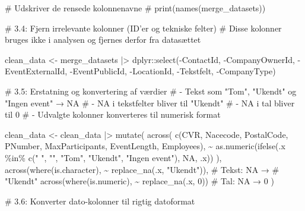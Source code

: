 \documentclass[
  11pt,
  letterpaper,
  DIV=11,
  numbers=noendperiod]{scrartcl}
\newenvironment{Shaded}{\begin{snugshade}}{\end{snugshade}}
\newcommand{\CommentTok}[1]{\textcolor[rgb]{0.37,0.37,0.37}{#1}}
\newcommand{\ConstantTok}[1]{\textcolor[rgb]{0.56,0.35,0.01}{#1}}
\newcommand{\DecValTok}[1]{\textcolor[rgb]{0.68,0.00,0.00}{#1}}
\newcommand{\FunctionTok}[1]{\textcolor[rgb]{0.28,0.35,0.67}{#1}}
\newcommand{\NormalTok}[1]{\textcolor[rgb]{0.00,0.23,0.31}{#1}}
\newcommand{\OtherTok}[1]{\textcolor[rgb]{0.00,0.23,0.31}{#1}}
\newcommand{\SpecialCharTok}[1]{\textcolor[rgb]{0.37,0.37,0.37}{#1}}
\newcommand{\StringTok}[1]{\textcolor[rgb]{0.13,0.47,0.30}{#1}}
\begin{document}
\begin{Shaded}
\begin{Highlighting}[]
\CommentTok{\# Udskriver de rensede kolonnenavne}
\CommentTok{\# print(names(merge\_datasets))}

\CommentTok{\# 3.4: Fjern irrelevante kolonner (ID’er og tekniske felter)}
\CommentTok{\# Disse kolonner bruges ikke i analysen og fjernes derfor fra datasættet}

\NormalTok{clean\_data }\OtherTok{\textless{}{-}}\NormalTok{ merge\_datasets }\SpecialCharTok{|\textgreater{}} 
\NormalTok{  dplyr}\SpecialCharTok{::}\FunctionTok{select}\NormalTok{(}\SpecialCharTok{{-}}\NormalTok{ContactId, }\SpecialCharTok{{-}}\NormalTok{CompanyOwnerId, }\SpecialCharTok{{-}}\NormalTok{EventExternalId,}
                \SpecialCharTok{{-}}\NormalTok{EventPublicId, }\SpecialCharTok{{-}}\NormalTok{LocationId, }\SpecialCharTok{{-}}\NormalTok{Tekstfelt, }\SpecialCharTok{{-}}\NormalTok{CompanyType)}


\CommentTok{\# 3.5: Erstatning og konvertering af værdier}
\CommentTok{\# {-} Tekst som "Tom", "Ukendt" og "Ingen event" → NA}
\CommentTok{\# {-} NA i tekstfelter bliver til "Ukendt"}
\CommentTok{\# {-} NA i tal bliver til 0}
\CommentTok{\# {-} Udvalgte kolonner konverteres til numerisk format}

\NormalTok{clean\_data }\OtherTok{\textless{}{-}}\NormalTok{ clean\_data }\SpecialCharTok{|\textgreater{}}
  \FunctionTok{mutate}\NormalTok{(}
    \FunctionTok{across}\NormalTok{(}
      \FunctionTok{c}\NormalTok{(CVR, Nacecode, PostalCode, PNumber, MaxParticipants, }
\NormalTok{        EventLength, Employees), }\SpecialCharTok{\textasciitilde{}} \FunctionTok{as.numeric}\NormalTok{(}\FunctionTok{ifelse}\NormalTok{(.x }\SpecialCharTok{\%in\%} \FunctionTok{c}\NormalTok{(}\StringTok{" "}\NormalTok{, }\StringTok{""}\NormalTok{, }\StringTok{"Tom"}\NormalTok{, }
                                            \StringTok{"Ukendt"}\NormalTok{, }\StringTok{"Ingen event"}\NormalTok{), }\ConstantTok{NA}\NormalTok{, .x))}
\NormalTok{    ),}
    \FunctionTok{across}\NormalTok{(}\FunctionTok{where}\NormalTok{(is.character), }\SpecialCharTok{\textasciitilde{}} \FunctionTok{replace\_na}\NormalTok{(.x, }\StringTok{"Ukendt"}\NormalTok{)), }\CommentTok{\# Tekst: NA → }
    \CommentTok{\# "Ukendt"}
    \FunctionTok{across}\NormalTok{(}\FunctionTok{where}\NormalTok{(is.numeric), }\SpecialCharTok{\textasciitilde{}} \FunctionTok{replace\_na}\NormalTok{(.x, }\DecValTok{0}\NormalTok{))             }\CommentTok{\# Tal: NA → 0}
\NormalTok{  )}


\CommentTok{\# 3.6: Konverter dato{-}kolonner til rigtig datoformat}


\end{Highlighting}
\end{Shaded}
\end{document}
